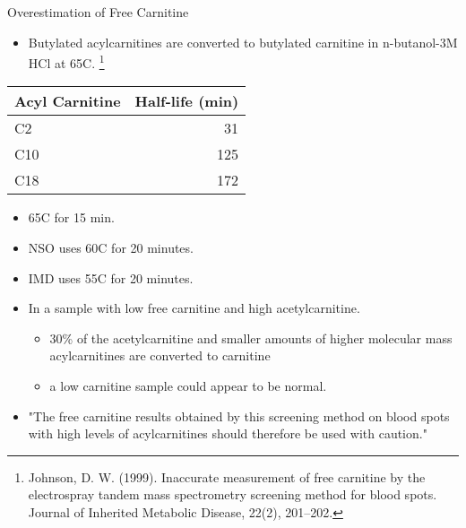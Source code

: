 \documentclass[presentation, smaller]{beamer}
\begin{document}
\begin{frame}[label={sec:orgheadline5}]{Overestimation of Free Carnitine}
\begin{itemize}
\item Butylated acylcarnitines are converted to butylated carnitine in
n-butanol-3M HCl at 65\degree{}C. \footnote{Johnson, D. W. (1999). Inaccurate measurement of free
carnitine by the electrospray tandem mass spectrometry screening
method for blood spots. Journal of Inherited Metabolic Disease, 22(2),
201–202.}
\end{itemize}

\begin{center}
\begin{tabular}{lr}
Acyl Carnitine & Half-life (min)\\
\hline
C2 & 31\\
C10 & 125\\
C18 & 172\\
\end{tabular}
\end{center}

\begin{itemize}
\item 65\degree{}C for 15 min.
\item NSO uses 60\degree{}C for 20 minutes.
\item IMD uses 55\degree{}C for 20 minutes.

\item In a sample with low free carnitine and high acetylcarnitine.
\begin{itemize}
\item 30\% of the acetylcarnitine and smaller amounts of higher
molecular mass acylcarnitines are converted to carnitine
\item a low carnitine sample could appear to be normal.
\end{itemize}
\item "The free carnitine results obtained by this screening method on
blood spots with high levels of acylcarnitines should therefore be
used with caution." \footnotemark[1]{}
\end{itemize}
\end{frame}
\end{document}
